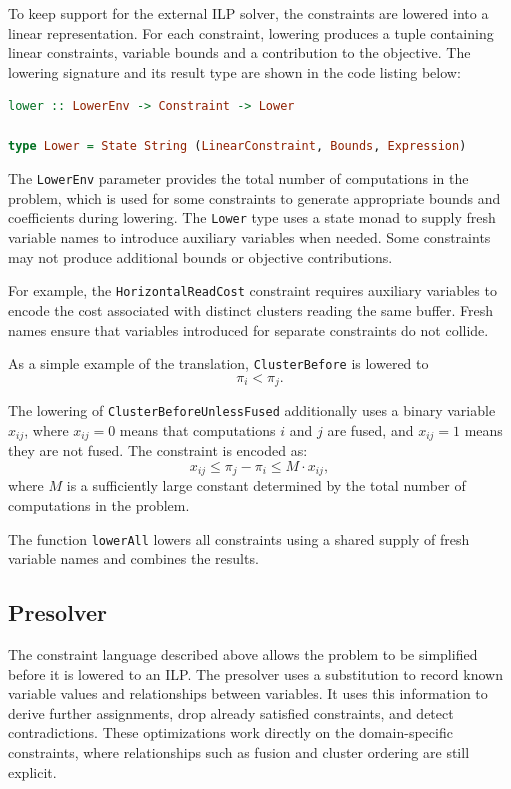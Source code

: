 To keep support for the external ILP solver, the constraints are lowered into a linear representation.
For each constraint, lowering produces a tuple containing linear constraints, variable bounds and a contribution to the objective.
The lowering signature and its result type are shown in the code listing below:

\begin{lstlisting}[language=Haskell]
lower :: LowerEnv -> Constraint -> Lower

type Lower = State String (LinearConstraint, Bounds, Expression)
\end{lstlisting}

The \texttt{LowerEnv} parameter provides the total number of computations in the problem, which is used for some constraints to generate appropriate bounds and coefficients during lowering.
The \texttt{Lower} type uses a state monad to supply fresh variable names to introduce auxiliary variables when needed.
Some constraints may not produce additional bounds or objective contributions.

For example, the \texttt{HorizontalReadCost} constraint requires auxiliary variables to encode the cost associated with distinct clusters reading the same buffer.
Fresh names ensure that variables introduced for separate constraints do not collide.

As a simple example of the translation, \texttt{ClusterBefore} is lowered to
\[
   \pi_i < \pi_j.
\]

The lowering of \texttt{ClusterBeforeUnlessFused} additionally uses a binary variable $x_{ij}$, where $x_{ij} = 0$ means that computations $i$ and $j$ are fused, and $x_{ij} = 1$ means they are not fused.
The constraint is encoded as:
\[
    x_{ij} \leq \pi_j - \pi_i \leq M \cdot x_{ij},
\]
where $M$ is a sufficiently large constant determined by the total number of computations in the problem.

The function \texttt{lowerAll} lowers all constraints using a shared supply of fresh variable names and combines the results.

\subsection{Presolver}

The constraint language described above allows the problem to be simplified before it is lowered to an ILP.
The presolver uses a substitution to record known variable values and relationships between variables.
It uses this information to derive further assignments, drop already satisfied constraints, and detect contradictions.
These optimizations work directly on the domain-specific constraints, where relationships such as fusion and cluster ordering are still explicit.

